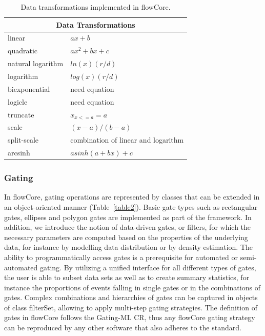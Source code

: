 \documentclass[12pt]{article}
\begin{document}
\begin{table}[ht]
\begin{center}
\begin{tabular}{|l|l|}
\hline
\multicolumn{2}{|c|}{Data Transformations} \\
\hline
linear & $ax + b$ \\
quadratic & $ax^2 + bx + c$ \\
natural logarithm & $ln(x)(r/d)$ \\
logarithm & $log(x)(r/d)$ \\
biexponential & need equation \\
logicle& need equation \\
truncate & $x_{x<=a} = a$ \\
scale & $(x-a)/(b-a)$ \\
split-scale & combination of linear and logarithm \\
arcsinh & $asinh(a + bx)+c$ \\
\hline
\end{tabular}
\caption{\label{table1}Data transformations implemented in flowCore.}
\end{center}
\end{table}

\subsubsection*{Gating}
In flowCore, gating operations are represented by classes that can be
extended in an object-oriented manner (Table~\ref{table2}). Basic gate
types such as rectangular gates, ellipses and polygon gates are
implemented as part of the framework. In addition, we introduce the
notion of data-driven gates, or filters, for which the necessary
parameters are computed based on the properties of the underlying
data, for instance by modelling data distribution or by density
estimation. The ability to programmatically access gates is a
prerequisite for automated or semi-automated gating. By utilizing a
unified interface for all different types of gates, the user is able
to subset data sets as well as to create summary statistics, for
instance the proportions of events falling in single gates or in the
combinations of gates. Complex combinations and hierarchies of gates
can be captured in objects of class filterSet, allowing to apply
multi-step gating strategies. The definition of gates in flowCore
follows the Gating-ML CR, thus any flowCore gating strategy can be
reproduced by any other software that also adheres to the standard.
\end{document}

